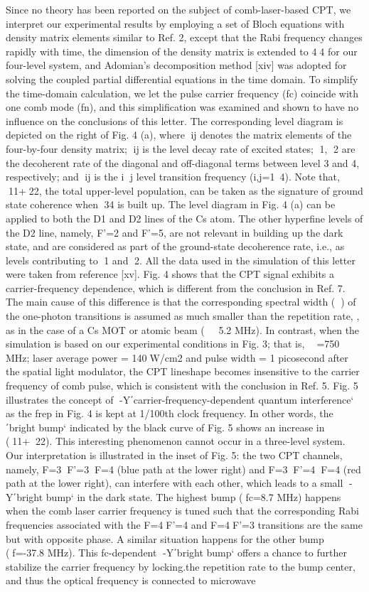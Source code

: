      Since no theory has been reported on the subject of comb-laser-based CPT, we interpret our experimental results by employing a set of Bloch equations with density matrix elements similar to Ref. 2, except that the Rabi frequency changes rapidly with time, the dimension of the density matrix is extended to 44 for our four-level system, and Adomian’s decomposition method [xiv] was adopted for solving the coupled partial differential equations in the time domain. To simplify the time-domain calculation, we let the pulse carrier frequency (fc) coincide with one comb mode (fn), and this simplification was examined and shown to have no influence on the conclusions of this letter. The corresponding level diagram is depicted on the right of Fig. 4 (a), where ij denotes the matrix elements of the four-by-four density matrix; ij is the level decay rate of excited states; 1, 2 are the decoherent rate of the diagonal and off-diagonal terms between level 3 and 4, respectively; and ij is the i j level transition frequency (i,j=1~4). Note that, 11+22, the total upper-level population, can be taken as the signature of ground state coherence when 34 is built up. The level diagram in Fig. 4 (a) can be applied to both the D1 and D2 lines of the Cs atom. The other hyperfine levels of the D2 line, namely, F’=2 and F’=5, are not relevant in building up the dark state, and are considered as part of the ground-state decoherence rate, i.e., as levels contributing to 1 and 2. All the data used in the simulation of this letter were taken from reference [xv]. Fig. 4 shows that the CPT signal exhibits a carrier-frequency dependence, which is different from the conclusion in Ref. 7. The main cause of this difference is that the corresponding spectral width () of the one-photon transitions is assumed as much smaller than the repetition rate, , as in the case of a Cs MOT or atomic beam (5.2 MHz). In contrast, when the simulation is based on our experimental conditions in Fig. 3; that is,  =750 MHz; laser average power = 140W/cm2 and pulse width = 1 picosecond after the spatial light modulator, the CPT lineshape becomes insensitive to the carrier frequency of comb pulse, which is consistent with the conclusion in Ref. 5. Fig. 5 illustrates the concept of -Y΄carrier-frequency-dependent quantum interference‘ as the frep in Fig. 4 is kept at 1/100th clock frequency. In other words, the ΄bright bump‘ indicated by the black curve of Fig. 5 shows an increase in (11+22). This interesting phenomenon cannot occur in a three-level system. Our interpretation is illustrated in the inset of Fig. 5: the two CPT channels, namely, F=3F’=3F=4 (blue path at the lower right) and F=3F’=4F=4 (red path at the lower right), can interfere with each other, which leads to a small -Y΄bright bump‘ in the dark state. The highest bump (fc=8.7 MHz) happens when the comb laser carrier frequency is tuned such that the corresponding Rabi frequencies associated with the F=4F’=4 and F=4F’=3 transitions are the same but with opposite phase.  A similar situation happens for the other bump (f=-37.8 MHz). This fc-dependent -Y΄bright bump‘ offers a chance to further stabilize the carrier frequency by locking.the repetition rate to the bump center, and thus the optical frequency is connected to microwave 